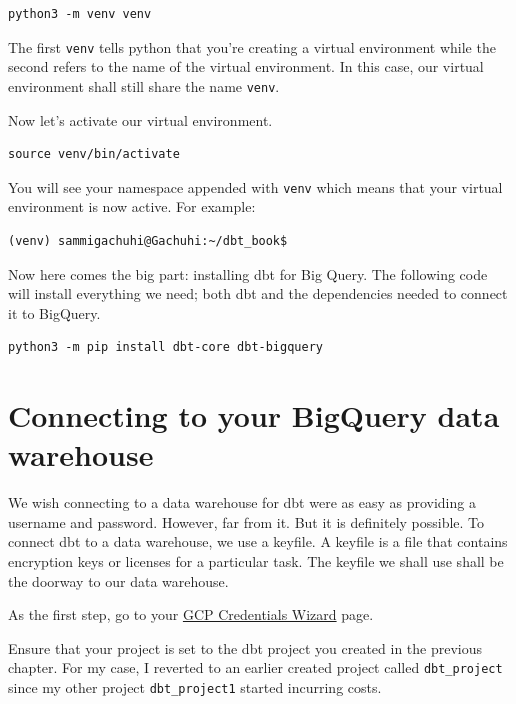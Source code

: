 \documentclass[
]{book}
\begin{document}
\begin{verbatim}
python3 -m venv venv
\end{verbatim}

The first \texttt{venv} tells python that you're creating a virtual environment while the second refers to the name of the virtual environment. In this case, our virtual environment shall still share the name \texttt{venv}.

Now let's activate our virtual environment.

\begin{verbatim}
source venv/bin/activate
\end{verbatim}

You will see your namespace appended with \texttt{venv} which means that your virtual environment is now active. For example:

\begin{verbatim}
(venv) sammigachuhi@Gachuhi:~/dbt_book$ 
\end{verbatim}

Now here comes the big part: installing dbt for Big Query. The following code will install everything we need; both dbt and the dependencies needed to connect it to BigQuery.

\begin{verbatim}
python3 -m pip install dbt-core dbt-bigquery
\end{verbatim}

\hypertarget{connecting-to-your-bigquery-data-warehouse}{%
\section{Connecting to your BigQuery data warehouse}\label{connecting-to-your-bigquery-data-warehouse}}

We wish connecting to a data warehouse for dbt were as easy as providing a username and password. However, far from it. But it is definitely possible. To connect dbt to a data warehouse, we use a keyfile. A keyfile is a file that contains encryption keys or licenses for a particular task. The keyfile we shall use shall be the doorway to our data warehouse.

As the first step, go to your \href{https://console.cloud.google.com/apis/credentials/wizard}{GCP Credentials Wizard} page.

Ensure that your project is set to the dbt project you created in the previous chapter. For my case, I reverted to an earlier created project called \texttt{dbt\_project} since my other project \texttt{dbt\_project1} started incurring costs.
\end{document}
